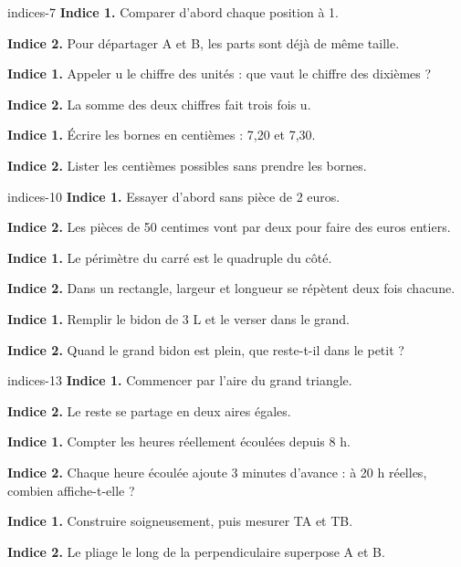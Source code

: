 \begin{blocEdition}{indices-7}
\textbf{Indice 1.} Comparer d’abord chaque position à 1.\par\medskip\textbf{Indice 2.} Pour départager A et B, les parts sont déjà de même taille.\par
{}\textbf{Indice 1.} Appeler u le chiffre des unités : que vaut le chiffre des dixièmes ?\par\medskip\textbf{Indice 2.} La somme des deux chiffres fait trois fois u.\par
{}\textbf{Indice 1.} Écrire les bornes en centièmes : 7,20 et 7,30.\par\medskip\textbf{Indice 2.} Lister les centièmes possibles sans prendre les bornes.\par

\end{blocEdition}
\begin{blocEdition}{indices-10}
\textbf{Indice 1.} Essayer d’abord sans pièce de 2 euros.\par\medskip\textbf{Indice 2.} Les pièces de 50 centimes vont par deux pour faire des euros entiers.\par
{}\textbf{Indice 1.} Le périmètre du carré est le quadruple du côté.\par\medskip\textbf{Indice 2.} Dans un rectangle, largeur et longueur se répètent deux fois chacune.\par
{}\textbf{Indice 1.} Remplir le bidon de 3 L et le verser dans le grand.\par\medskip\textbf{Indice 2.} Quand le grand bidon est plein, que reste-t-il dans le petit ?\par

\end{blocEdition}
\begin{blocEdition}{indices-13}
\textbf{Indice 1.} Commencer par l’aire du grand triangle.\par\medskip\textbf{Indice 2.} Le reste se partage en deux aires égales.\par
{}\textbf{Indice 1.} Compter les heures réellement écoulées depuis 8 h.\par\medskip\textbf{Indice 2.} Chaque heure écoulée ajoute 3 minutes d’avance : à 20 h réelles, combien affiche-t-elle ?\par
{}\textbf{Indice 1.} Construire soigneusement, puis mesurer TA et TB.\par\medskip\textbf{Indice 2.} Le pliage le long de la perpendiculaire superpose A et B.\par

\end{blocEdition}
